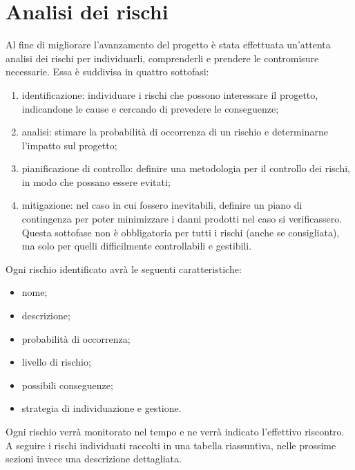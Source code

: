 \documentclass[../PianoProgetto.tex]{subfiles}
\begin{document}
\section{Analisi dei rischi}

	Al fine di migliorare l'avanzamento del progetto è stata effettuata un'attenta analisi dei rischi per individuarli, comprenderli e prendere le contromisure necessarie. Essa è suddivisa in quattro sottofasi:
	\begin{enumerate}
	\item identificazione: individuare i rischi che possono interessare il progetto, indicandone le cause e cercando di prevedere le conseguenze;
	\item analisi: stimare la probabilità di occorrenza di un rischio e determinarne l'impatto sul progetto;
	\item pianificazione di controllo: definire una metodologia per il controllo dei rischi, in modo che possano essere evitati;
	\item mitigazione: nel caso in cui fossero inevitabili, definire un piano di contingenza per poter minimizzare i danni prodotti nel caso si verificassero. Questa sottofase non è obbligatoria per tutti i rischi (anche se consigliata), ma solo per quelli difficilmente controllabili e gestibili.
	\end{enumerate}
	Ogni rischio identificato avrà le seguenti caratteristiche: 
		\begin{itemize}
			\item nome;
			\item descrizione; 
			\item probabilità di occorrenza;
			\item livello di rischio;
			\item possibili conseguenze;
			\item strategia di individuazione e gestione. 
		\end{itemize}	
	Ogni rischio verrà monitorato nel tempo e ne verrà indicato l'effettivo riscontro. A seguire i rischi individuati raccolti in una tabella riassuntiva, nelle prossime sezioni invece una descrizione dettagliata.	
		
	\newpage
	
\end{document}
